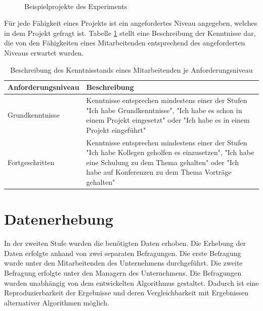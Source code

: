 \begin{figure}[H]
    \\
\caption[Beispielprojekte des Experiments]{Beispielprojekte des Experiments}
  \label{fig:methodik:abb2}
\end{figure}

Für jede Fähigkeit eines Projekts ist ein angefordertes Niveau angegeben, welches in dem Projekt gefragt ist.
Tabelle \ref{tab:methodik:tab1} stellt eine Beschreibung der Kenntnisse dar, die von den Fähigkeiten eines Mitarbeitenden entsprechend des angeforderten Niveaus erwartet wurden.

\begin{table}[htbp]
    \begin{center}
    \begin{tabular}{p{1.5in}|p{3.25in}}
    {\textbf{Anforderungsniveau}} & {\textbf{Beschreibung}}\\
    \hline
	Grundkenntnisse & Kenntnisse entsprechen mindestens einer der Stufen "Ich habe Grundkenntnisse", "Ich habe es schon in einem Projekt eingesetzt" oder "Ich habe es in einem Projekt eingeführt" \\
    \hline
    Fortgeschritten & Kenntnisse entsprechen mindestens einer der Stufen "Ich habe Kollegen geholfen es einzusetzen", "Ich habe eine Schulung zu dem Thema gehalten" oder "Ich habe auf Konferenzen zu dem Thema Vorträge gehalten" \\
    \end{tabular}
    \end{center}
    \caption[Beschreibung des Kenntnisstands eines Mitarbeitenden je Anforderungsniveau]{Beschreibung des Kenntnisstands eines Mitarbeitenden je Anforderungsniveau}
	\label{tab:methodik:tab1}
\end{table}

\section{Datenerhebung}
\label{ch:methodik:datenerhebung}
In der zweiten Stufe wurden die benötigten Daten erhoben.
Die Erhebung der Daten erfolgte anhand von zwei separaten Befragungen.
Die erste Befragung wurde unter den Mitarbeitenden des Unternehmens durchgeführt.
Die zweite Befragung erfolgte unter den Managern des Unternehmens.
Die Befragungen wurden unabhängig von dem entwickelten Algorithmus gestaltet.
Dadurch ist eine Reproduzierbarkeit der Ergebnisse und deren Vergleichbarkeit mit Ergebnissen alternativer Algorithmen möglich.

